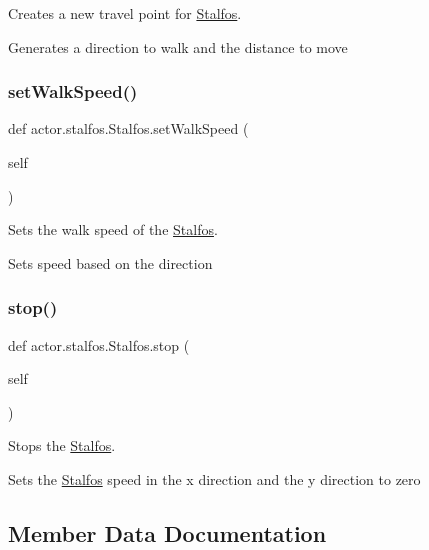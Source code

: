Creates a new travel point for \hyperlink{classactor_1_1stalfos_1_1_stalfos}{Stalfos}. 

Generates a direction to walk and the distance to move \mbox{\label{classactor_1_1stalfos_1_1_stalfos_ac3fe6cc13509504318f492473795dc41}} 
\subsubsection{\texorpdfstring{set\+Walk\+Speed()}{setWalkSpeed()}}
{\footnotesize\ttfamily def actor.\+stalfos.\+Stalfos.\+set\+Walk\+Speed (\begin{DoxyParamCaption}\item[{}]{self }\end{DoxyParamCaption})}



Sets the walk speed of the \hyperlink{classactor_1_1stalfos_1_1_stalfos}{Stalfos}. 

Sets speed based on the direction \mbox{\label{classactor_1_1stalfos_1_1_stalfos_abb5c74f32bbfa0a9d7d4bfaa60b6f2d7}} 
\subsubsection{\texorpdfstring{stop()}{stop()}}
{\footnotesize\ttfamily def actor.\+stalfos.\+Stalfos.\+stop (\begin{DoxyParamCaption}\item[{}]{self }\end{DoxyParamCaption})}



Stops the \hyperlink{classactor_1_1stalfos_1_1_stalfos}{Stalfos}. 

Sets the \hyperlink{classactor_1_1stalfos_1_1_stalfos}{Stalfos} speed in the x direction and the y direction to zero 

\subsection{Member Data Documentation}
\mbox{\label{classactor_1_1stalfos_1_1_stalfos_ae98d09367d88672074d0ae4622b03eda}} 
